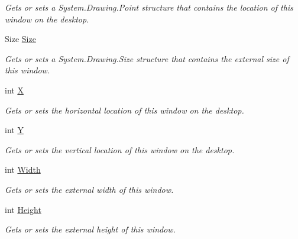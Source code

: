 \begin{DoxyCompactItemize}
\begin{DoxyCompactList}\small\item\em Gets or sets a System.\-Drawing.\-Point structure that contains the location of this window on the desktop. \end{DoxyCompactList}\item 
Size \hyperlink{interface_open_t_k_1_1_i_native_window_a987289178e2f63ce7eaf58d9cbe72ed5}{Size}
\begin{DoxyCompactList}\small\item\em Gets or sets a System.\-Drawing.\-Size structure that contains the external size of this window. \end{DoxyCompactList}\item 
int \hyperlink{interface_open_t_k_1_1_i_native_window_acf29eb685cc2fb7f6e4fd0fa11e7f147}{X}
\begin{DoxyCompactList}\small\item\em Gets or sets the horizontal location of this window on the desktop. \end{DoxyCompactList}\item 
int \hyperlink{interface_open_t_k_1_1_i_native_window_a7e5b77aadb970f82daabf0adedeb2b16}{Y}
\begin{DoxyCompactList}\small\item\em Gets or sets the vertical location of this window on the desktop. \end{DoxyCompactList}\item 
int \hyperlink{interface_open_t_k_1_1_i_native_window_a67659bdb41b907f0bbe9592e9a82d63f}{Width}
\begin{DoxyCompactList}\small\item\em Gets or sets the external width of this window. \end{DoxyCompactList}\item 
int \hyperlink{interface_open_t_k_1_1_i_native_window_a717a701ae1d8a942f55825f9372bd41f}{Height}
\begin{DoxyCompactList}\small\item\em Gets or sets the external height of this window. \end{DoxyCompactList}\item 

\end{DoxyCompactItemize}
